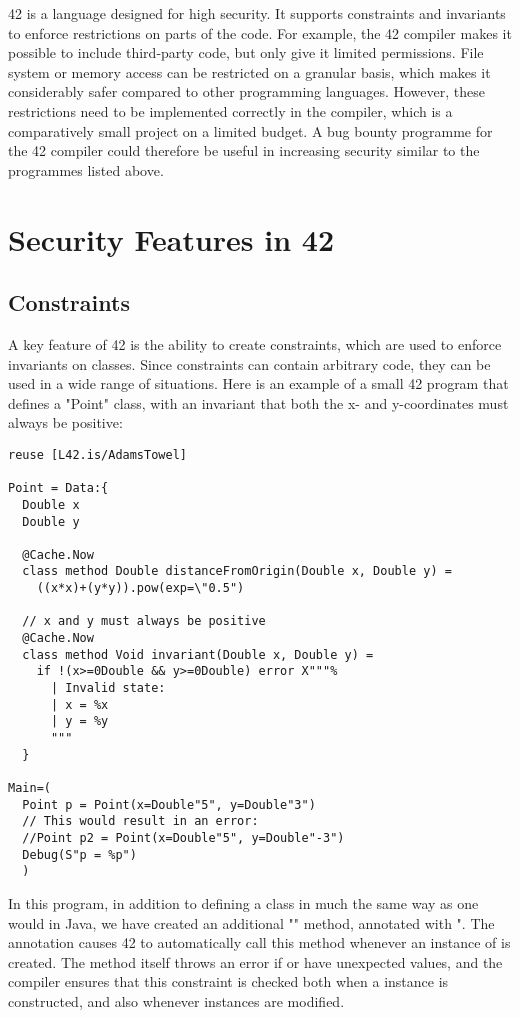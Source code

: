 42 is a language designed for high security. It supports constraints and invariants to enforce restrictions on parts of the code. For example, the 42 compiler makes it possible to include third-party code, but only give it limited permissions. File system or memory access can be restricted on a granular basis, which makes it considerably safer compared to other programming languages. However, these restrictions need to be implemented correctly in the compiler, which is a comparatively small project on a limited budget. A bug bounty programme for the 42 compiler could therefore be useful in increasing security similar to the programmes listed above.

\chapter{Security Features in 42}\label{C:sec}

\section{Constraints}

A key feature of 42 is the ability to create constraints, which are used to enforce invariants on classes. Since constraints can contain arbitrary code, they can be used in a wide range of situations. Here is an example of a small 42 program that defines a "Point" class, with an invariant that both the x- and y-coordinates must always be positive:

\begin{lstlisting}[caption=Simple Constraint]
reuse [L42.is/AdamsTowel]

Point = Data:{
  Double x
  Double y

  @Cache.Now
  class method Double distanceFromOrigin(Double x, Double y) = 
    ((x*x)+(y*y)).pow(exp=\"0.5")

  // x and y must always be positive
  @Cache.Now
  class method Void invariant(Double x, Double y) = 
    if !(x>=0Double && y>=0Double) error X"""%
      | Invalid state:
      | x = %x
      | y = %y
      """
  }

Main=(
  Point p = Point(x=Double"5", y=Double"3")
  // This would result in an error:
  //Point p2 = Point(x=Double"5", y=Double"-3")
  Debug(S"p = %p")
  )
\end{lstlisting}

In this program, in addition to defining a  class in much the same way as one would in Java, we have created an additional "" method, annotated with ". The annotation causes 42 to automatically call this method whenever an instance of  is created. The method itself throws an error if  or  have unexpected values, and the compiler ensures that this constraint is checked both when a  instance is constructed, and also whenever instances are modified.

